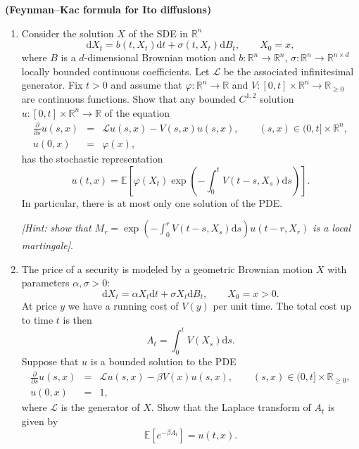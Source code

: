 \documentclass{article}
\newcommand{\mathd}{\mathrm{d}}
\newcommand{\tmtextbf}[1]{{\bfseries{#1}}}
\newcommand{\tmtextit}[1]{{\itshape{#1}}}
\newenvironment{enumeratealpha}{\begin{enumerate}[a{\textup{)}}] }{\end{enumerate}}
{\theorembodyfont{\rmfamily\small}\newtheorem{exercise}{Exercise}}
\begin{document}
\begin{exercise}
  [Pts 3+3]\tmtextbf{(Feynman--Kac formula for Ito diffusions)}
  \begin{enumeratealpha}
    \item Consider the solution $X$ of the SDE in $\mathbb{R}^n$
    \[ \mathd X_t = b (t, X_t) \mathd t + \sigma (t, X_t) \mathd B_t, \qquad
       X_0 = x, \]
    where $B$ is a $d$-dimensional Brownian motion and $b : \mathbb{R}^n_{}
    \rightarrow \mathbb{R}^n$, $\sigma : \mathbb{R}^n \rightarrow
    \mathbb{R}^{n \times d}$ locally bounded continuous coefficients. Let
    $\mathcal{L}$ be the associated infinitesimal generator. Fix $t > 0$ and
    assume that $\varphi : \mathbb{R}^n \rightarrow \mathbb{R}$ and $V : [0,
    t] \times \mathbb{R}^n \rightarrow \mathbb{R}_{\geqslant 0}$ are
    continuous functions. Show that any bounded $C^{1, 2}$ solution $u : [0,
    t] \times \mathbb{R}^n \rightarrow \mathbb{R}$ of the equation
    \[ \begin{array}{rcl}
         \frac{\partial}{\partial s} u (s, x) & = & \mathcal{L}u (s, x) - V
         (s, x) u (s, x), \qquad (s, x) \in (0, t] \times \mathbb{R}^n,\\
         u (0, x) & = & \varphi (x),
       \end{array} \]
    has the stochastic representation
    \[ u (t, x) =\mathbb{E} \left[ \varphi (X_t) \exp \left( - \int_0^t V (t -
       s, X_s) \mathd s \right) \right] . \]
    In particular, there is at most only one solution of the PDE.
    
    \tmtextit{[Hint: show that $M_r = \exp \left( - \int_0^r V (t - s, X_s)
    \mathd s \right) u (t - r, X_r)$ is a local martingale]}.
    
    \item The price of a security is modeled by a geometric Brownian motion
    $X$ with parameters $\alpha, \sigma > 0$:
    \[ \mathd X_t = \alpha X_t \mathd t + \sigma X_t \mathd B_t, \qquad X_0 =
       x > 0. \]
    At price $y$ we have a running cost of $V (y)$ per unit time. The total
    cost up to time $t$ is then
    \[ A_t = \int_0^t V (X_s) \mathd s. \]
    Suppose that $u$ is a bounded solution to the PDE
    \[ \begin{array}{rcl}
         \frac{\partial}{\partial s} u (s, x) & = & \mathcal{L}u (s, x) -
         \beta V (x) u (s, x), \qquad (s, x) \in (0, t] \times
         \mathbb{R}_{\geqslant 0},\\
         u (0, x) & = & 1,
       \end{array} \]
    where $\mathcal{L}$ is the generator of $X$. Show that the Laplace
    transform of $A_t$ is given by
    \[ \mathbb{E} [e^{- \beta A_t}] = u (t, x) . \]
  \end{enumeratealpha}
\end{exercise}
\end{document}
